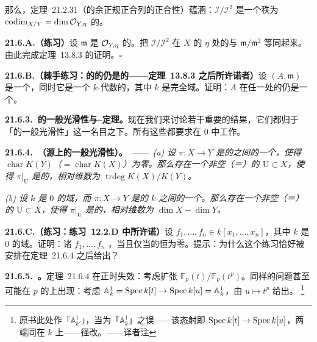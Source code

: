 那么，\mbox{定理~21.2.31}（\trSmooth\trVariety{}的余正规正合列的正合性）蕴涵：$\mathscr{I}/\mathscr{I}^2$ 是一个秩为 $\operatorname{codim}_{X/Y}=\dim\mathcal{O}_{Y,\eta}$ 的\trLocallyFreeSheaf。

\textbf{21.6.A.（练习）}\quad 设 $\mathfrak{m}$ 是 $\mathcal{O}_{Y,\eta}$ 的\trMaximalIdeal。把 $\mathscr{I}/\mathscr{I}^2$ 在 $X$ 的\trGenericPoint{} $\eta$ 处的\trStalk{}与 $\mathfrak{m}/\mathfrak{m}^2$ 等同起来。由此完成\mbox{定理~13.8.3} 的证明。\hfill$\square$

\textbf{21.6.B.（棘手练习：\trVariety{}的\trRegular\trLocalRing{}的\trLocalization{}仍是\trRegular{}的——\mbox{定理~13.8.3} 之后所许诺者）}\quad 设 $(A,\mathfrak{m})$ 是一个\trRegular\trLocalRing，同时它是一个\trFinitelyGenerated{} $k$-代数的\trLocalization，其中 $k$ 是完全域。证明：$A$ 在任一\trPrimeIdeal{}处的\trLocalization{}仍是一个\trRegular\trLocalRing。

\textbf{21.6.3.\ \trMorphisms{}的一般光滑性与\trKleiman--\trBertini{}定理。}\quad 现在我们来讨论若干重要的结果，它们都归于「\trMorphisms{}的一般光滑性」这一名目之下。所有这些都要求在\trCharacteristic{} $0$ 中工作。

\textbf{21.6.4.\ \trhTheorem（源上的一般光滑性）。}\ ——\ \emph{(a) 设 $\pi\colon X\to Y$ 是\trIntegral{}的\trNoetherian{}\trScheme{}之间的一个\trDominant\trFiniteType{}\trMorphism，使得 $\operatorname{char}K(Y)$（$=\operatorname{char}K(X)$）为零。那么存在一个非空（＝\trDense）的\trOpenSet{} $\mathrm{U}\subset X$，使得 $\pi|_{\mathrm{U}}$ 是\trSmooth{}的，相对维数为 $\operatorname{trdeg}K(X)/K(Y)$。}

\emph{(b) 设 $k$ 是\trCharacteristic{} $0$ 的域，而 $\pi\colon X\to Y$ 是\trIntegral{}的 $k$-\trVariety{}之间的一个\trDominant\trMorphism。那么存在一个非空（＝\trDense）的\trOpenSet{} $\mathrm{U}\subset X$，使得 $\pi|_{\mathrm{U}}$ 是\trSmooth{}的，相对维数为 $\dim X-\dim Y$。}

\textbf{21.6.C.（练习：\mbox{练习~12.2.D} 中所许诺）}\quad 设 $f_1,\dots,f_n\in k[x_1,\dots,x_n]$，其中 $k$ 是\trCharacteristic{} $0$ 的域。证明：诸 $f_1,\dots,f_n$ \trAlgebraicallyDependent，当且仅当\trJacobianMatrix{}的\trDeterminant{}恒为零。提示：为什么这个练习恰好被安排在\mbox{定理~21.6.4} 之后给出？

\textbf{21.6.5.\ \trhExample。}\quad \mbox{定理~21.6.4} 在正\trCharacteristic{}时失效：考虑\trPurelyInseparable{}扩张 $\mathbb{F}_p(t)/\mathbb{F}_p(t^p)$。同样的问题甚至可能在\trCharacteristic{} $p$ 的\trAlgClosedField{}上出现：考虑 $\mathbb{A}^1_k=\operatorname{Spec} k[t]\to\operatorname{Spec} k[u]=\mathbb{A}^1_k$，由 $u\mapsto t^p$ 给出。%
\footnote{原书此处作「$\mathbb{A}^1_{k'}$」，当为「$\mathbb{A}^1_k$」之误——该态射即 $\operatorname{Spec} k[t]\to\operatorname{Spec} k[u]$，两端同在 $k$ 上——径改。——译者注}

